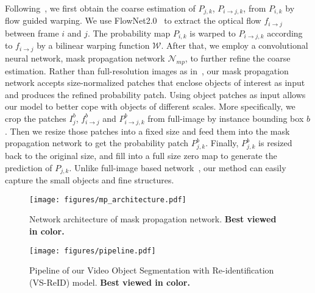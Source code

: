 Following~\cite{Perazzi2017, khoreva_lucid_dreams17}, we first obtain the coarse estimation of $P_{j,k}$, $P_{i \to j, k}$, from $P_{i,k}$ by flow guided warping.
%
We use FlowNet2.0~\cite{IMKDB17} to extract the optical flow $f_{i \to j}$ between frame $i$ and $j$.
%
The probability map $P_{i,k}$ is warped to $P_{i \to j, k}$ according to $f_{i \to j}$ by a bilinear warping function $\mathcal{W}$.
%
After that, we employ a convolutional neural network, mask propagation network $\mathcal{N}_{mp}$, to further refine the coarse estimation.
%
 Rather than full-resolution images as in~\cite{Perazzi2017, khoreva_lucid_dreams17}, our mask propagation network accepts size-normalized patches that enclose objects of interest as input and produces the refined probability patch. Using object patches as input allows our model to better cope with objects of different scales.
%
More specifically, we crop the patches $ I_j^b$, $f_{i \to j}^b$ and $P_{i \to j, k}^b$ from full-image by instance bounding box $b$.
%
Then we resize those patches into a fixed size and feed them into the mask propagation network to get the probability patch $P_{j,k}^b$.
%
Finally, $P_{j,k}^b$ is resized back to the original size, and fill into a full size zero map to generate the prediction of $P_{j,k}$.
%
Unlike full-image based network~\cite{Perazzi2017, khoreva_lucid_dreams17}, our method can easily capture the small objects and fine structures.


\begin{figure}
	\centering
	\texttt{[image: figures/mp\_architecture.pdf]}
	\caption{\small{Network architecture of mask propagation network. \textbf{Best viewed in color.}}}
	\label{fig:mp_network}
	\vspace{-12pt}
\end{figure}

\begin{figure*}[t]
	\centering
	\texttt{[image: figures/pipeline.pdf]}
	\caption{\small{Pipeline of our Video Object Segmentation with Re-identification (VS-ReID) model. \textbf{Best viewed in color.}}}
	\label{fig:pipeline}
	\vspace{-10pt}
\end{figure*}

